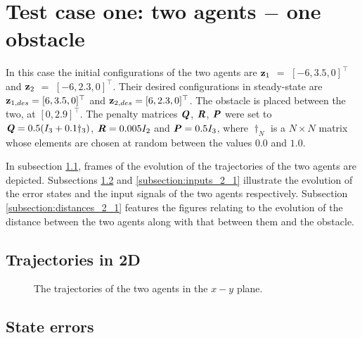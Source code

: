 \section{Test case one: two agents $-$ one obstacle}

In this case the initial configurations of the two agents are
$\bm{\mathbf{z}}_1$ $=$ $[-6, 3.5, 0]^{\top}$ and
$\bm{\mathbf{z}}_2$ $=$ $[-6, 2.3, 0]^{\top}$.
Their desired configurations in steady-state are
$\bm{\mathbf{z}}_{1,des} = [6, 3.5, 0]^{\top}$ and
$\bm{\mathbf{z}}_{2,des} = [6, 2.3, 0]^{\top}$.
The obstacle is placed between the two, at $[0, 2.9]^{\top}$. The penalty
matrices $\bm{\mathit{Q}}$, $\bm{\mathit{R}}$, $\bm{\mathit{P}}$ were set to
$\bm{\mathit{Q}} = 0.5 (I_3 + 0.1 \dagger_3)$, $\bm{\mathit{R}} = 0.005 I_2$ and
$\bm{\mathit{P}} = 0.5 I_3$, where $\dagger_N$ is a $N \times N$ matrix whose
elements are chosen at random between the values $0.0$ and $1.0$.

In subsection \ref{subsection:trajectories_2_1}, frames of the evolution of the
trajectories of the two agents are depicted. Subsections
\ref{subsection:errors_2_1} and \ref{subsection:inputs_2_1} illustrate
the evolution of the error states and the input signals of the two agents
respectively. Subsection \ref{subsection:distances_2_1} features the
figures relating to the evolution of the distance between the two agents
along with that between them and the obstacle.



\subsection{Trajectories in 2D}
\label{subsection:trajectories_2_1}

\begin{figure}[H]
  
  \caption{The trajectories of the two agents in the $x-y$ plane.}
  \label{fig:d_OFF_trajectory_2_1}
\end{figure}


\subsection{State errors}
\label{subsection:errors_2_1}

